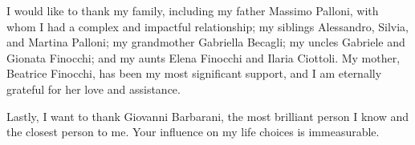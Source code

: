 I would like to thank my family, including my father Massimo Palloni, with whom I had a complex and impactful relationship; my siblings Alessandro, Silvia, and Martina Palloni; my grandmother Gabriella Becagli; my uncles Gabriele and Gionata Finocchi; and my aunts Elena Finocchi and Ilaria Ciottoli. My mother, Beatrice Finocchi, has been my most significant support, and I am eternally grateful for her love and assistance.

Lastly, I want to thank Giovanni Barbarani, the most brilliant person I know and the closest person to me. Your influence on my life choices is immeasurable.

